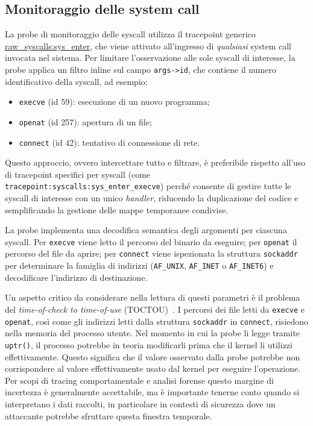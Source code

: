 \subsection{Monitoraggio delle system call}

La probe di monitoraggio delle syscall utilizza il tracepoint generico \url{raw\_syscalls:sys\_enter}, che viene attivato all'ingresso di \textit{qualsiasi} system call invocata nel sistema. Per limitare l'osservazione alle sole syscall di interesse, la probe applica un filtro inline sul campo \texttt{args->id}, che contiene il numero identificativo della syscall, ad esempio:

\begin{itemize}
    \item \texttt{execve} (id 59): esecuzione di un nuovo programma;
    \item \texttt{openat} (id 257): apertura di un file;
    \item \texttt{connect} (id 42): tentativo di connessione di rete.
\end{itemize}

Questo approccio, ovvero intercettare tutto e filtrare, è preferibile rispetto all'uso di tracepoint specifici per syscall (come \texttt{tracepoint:syscalls:sys\_enter\_execve}) perché consente di gestire tutte le syscall di interesse con un unico \textit{handler}, riducendo la duplicazione del codice e semplificando la gestione delle mappe temporanee condivise.

La probe implementa una decodifica semantica degli argomenti per ciascuna syscall. Per \texttt{execve} viene letto il percorso del binario da eseguire; per \texttt{openat} il percorso del file da aprire; per \texttt{connect} viene ispezionata la struttura \texttt{sockaddr} per determinare la famiglia di indirizzi (\texttt{AF\_UNIX}, \texttt{AF\_INET} o \texttt{AF\_INET6}) e decodificare l'indirizzo di destinazione.

Un aspetto critico da considerare nella lettura di questi parametri è il problema del \textit{time-of-check to time-of-use} (TOCTOU)~\cite{toctou}. I percorsi dei file letti da \texttt{execve} e \texttt{openat}, così come gli indirizzi letti dalla struttura \texttt{sockaddr} in \texttt{connect}, risiedono nella memoria del processo utente. Nel momento in cui la probe li legge tramite \texttt{uptr()}, il processo potrebbe in teoria modificarli prima che il kernel li utilizzi effettivamente. Questo significa che il valore osservato dalla probe potrebbe non corrispondere al valore effettivamente usato dal kernel per eseguire l'operazione. Per scopi di tracing comportamentale e analisi forense questo margine di incertezza è generalmente accettabile, ma è importante tenerne conto quando si interpretano i dati raccolti, in particolare in contesti di sicurezza dove un attaccante potrebbe sfruttare questa finestra temporale.


